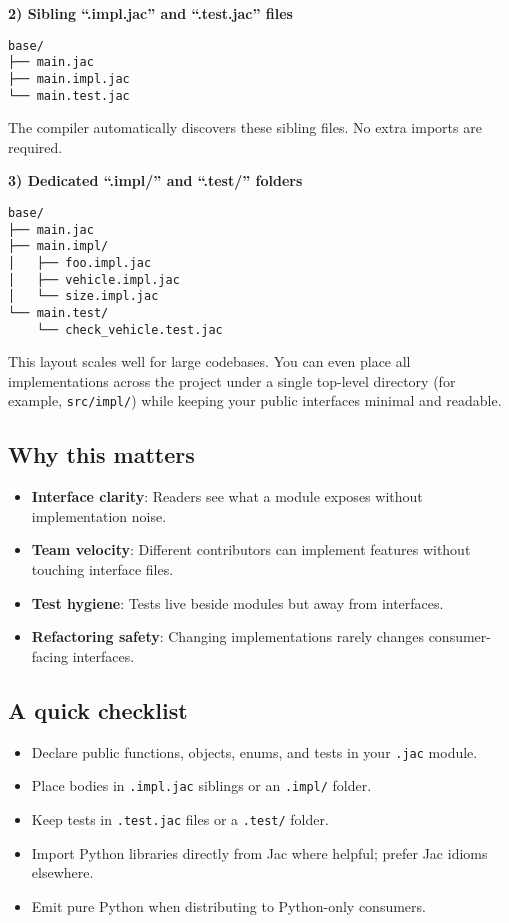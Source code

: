 \textbf{2) Sibling ``.impl.jac'' and ``.test.jac'' files}

\begin{lstlisting}[language=shell]
base/
├── main.jac
├── main.impl.jac
└── main.test.jac
\end{lstlisting}

The compiler automatically discovers these sibling files. No extra imports are required.

\textbf{3) Dedicated ``.impl/'' and ``.test/'' folders}

\begin{lstlisting}[language=shell]
base/
├── main.jac
├── main.impl/
│   ├── foo.impl.jac
│   ├── vehicle.impl.jac
│   └── size.impl.jac
└── main.test/
    └── check_vehicle.test.jac
\end{lstlisting}

This layout scales well for large codebases. You can even place all implementations across the project under a single top-level directory (for example, \texttt{src/impl/}) while keeping your public interfaces minimal and readable.

\subsection*{Why this matters}
\begin{itemize}
    \item \textbf{Interface clarity}: Readers see what a module exposes without implementation noise.
    \item \textbf{Team velocity}: Different contributors can implement features without touching interface files.
    \item \textbf{Test hygiene}: Tests live beside modules but away from interfaces.
    \item \textbf{Refactoring safety}: Changing implementations rarely changes consumer-facing interfaces.
\end{itemize}

\subsection*{A quick checklist}
\begin{itemize}
    \item Declare public functions, objects, enums, and tests in your \texttt{.jac} module.
    \item Place bodies in \texttt{.impl.jac} siblings or an \texttt{.impl/} folder.
    \item Keep tests in \texttt{.test.jac} files or a \texttt{.test/} folder.
    \item Import Python libraries directly from Jac where helpful; prefer Jac idioms elsewhere.
    \item Emit pure Python when distributing to Python-only consumers.
\end{itemize}